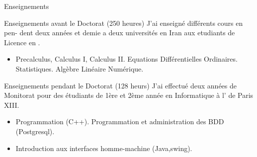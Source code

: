 \begin{frame}{Enseignements}
\begin{block}{Enseignements avant le Doctorat (250 heures)}
J’ai enseigné différents cours en  pen-
dent deux années et demie a deux universités en Iran aux etudiants
de Licence en .
\begin{itemize}
\item Precalculus, Calculus I, Calculus II. Equations Différentielles Ordinaires. Statistiques. Algèbre Linéaire Numérique.
\end{itemize}
\end{block}
%
\begin{block}{Enseignements pendant le Doctorat (128 heurs)}
J’ai effectué deux années de Monitorat pour des étudiants de 1ère
et 2ème année en Informatique à l’  de Paris XIII.
\begin{itemize}
\item Programmation (C++). Programmation et administration des BDD (Postgresql). 
\item Introduction aux interfaces homme-machine (Java,swing).
\end{itemize}
\end{block}
%
\end{frame}




